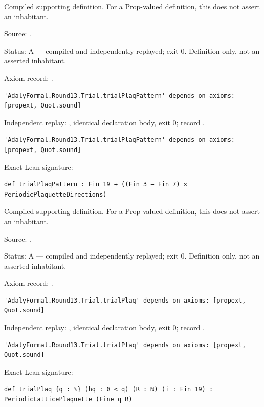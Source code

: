 \begin{definition}[bp-381]
\label{bp-381}
\leanok
Compiled supporting definition. For a Prop-valued definition, this does not assert an inhabitant.

\par Source: \texttt{}.
\par Status: A — compiled and independently replayed; exit 0. Definition only, not an asserted inhabitant.
\par Axiom record: \texttt{}.
\begin{verbatim}
'AdalyFormal.Round13.Trial.trialPlaqPattern' depends on axioms: [propext, Quot.sound]
\end{verbatim}
\par Independent replay: \texttt{}, identical declaration body, exit 0; record \texttt{}.
\begin{verbatim}
'AdalyFormal.Round13.Trial.trialPlaqPattern' depends on axioms: [propext, Quot.sound]
\end{verbatim}
\par Exact Lean signature:
\begin{verbatim}
def trialPlaqPattern : Fin 19 → ((Fin 3 → Fin 7) × PeriodicPlaquetteDirections)
\end{verbatim}
\end{definition}

\begin{definition}[bp-382]
\label{bp-382}
\leanok
Compiled supporting definition. For a Prop-valued definition, this does not assert an inhabitant.

\par Source: \texttt{}.
\par Status: A — compiled and independently replayed; exit 0. Definition only, not an asserted inhabitant.
\par Axiom record: \texttt{}.
\begin{verbatim}
'AdalyFormal.Round13.Trial.trialPlaq' depends on axioms: [propext, Quot.sound]
\end{verbatim}
\par Independent replay: \texttt{}, identical declaration body, exit 0; record \texttt{}.
\begin{verbatim}
'AdalyFormal.Round13.Trial.trialPlaq' depends on axioms: [propext, Quot.sound]
\end{verbatim}
\par Exact Lean signature:
\begin{verbatim}
def trialPlaq {q : ℕ} (hq : 0 < q) (R : ℕ) (i : Fin 19) : PeriodicLatticePlaquette (Fine q R)
\end{verbatim}
\end{definition}

